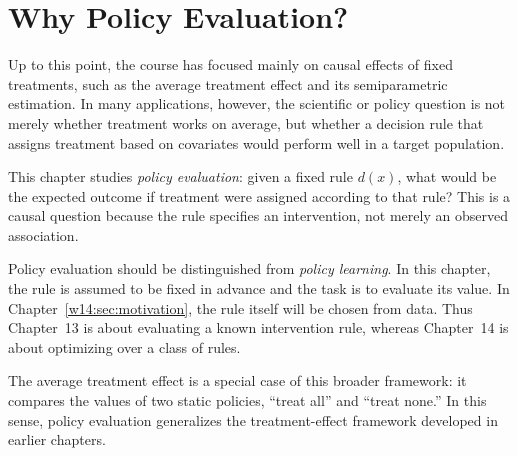 \documentclass[master.tex]{subfiles}
\begin{document}

\section{Why Policy Evaluation?}
\label{w13:sec:motivation}

Up to this point, the course has focused mainly on causal effects of fixed treatments, such as the average treatment effect and its semiparametric estimation. In many applications, however, the scientific or policy question is not merely whether treatment works on average, but whether a decision rule that assigns treatment based on covariates would perform well in a target population.

This chapter studies \emph{policy evaluation}: given a fixed rule $d(x)$, what would be the expected outcome if treatment were assigned according to that rule? This is a causal question because the rule specifies an intervention, not merely an observed association.

Policy evaluation should be distinguished from \emph{policy learning}. In this chapter, the rule is assumed to be fixed in advance and the task is to evaluate its value. In Chapter~\ref{w14:sec:motivation}, the rule itself will be chosen from data. Thus Chapter~13 is about evaluating a known intervention rule, whereas Chapter~14 is about optimizing over a class of rules.

The average treatment effect is a special case of this broader framework: it compares the values of two static policies, ``treat all'' and ``treat none.'' In this sense, policy evaluation generalizes the treatment-effect framework developed in earlier chapters.
\end{document}
